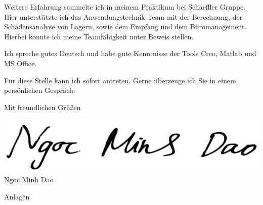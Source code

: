 \documentclass[11pt,a4paper]{letter}
\begin{document}

Weitere Erfahrung sammelte ich in meinem Praktikum bei Schaeffler Gruppe.
Hier unterstützte ich das Anwendungstechnik Team mit der Berechnung, der Schadensanalyse von Lagern, sowie dem Empfang und dem Büromanagement.
Hierbei konnte ich meine Teamfähigkeit unter Beweis stellen.

Ich spreche gutes Deutsch und habe gute Kenntnisse der Tools Creo, Matlab und MS Office.

Für diese Stelle kann ich sofort antreten.
Gerne überzeuge ich Sie in einem persönlichen Gespräch.

Mit freundlichen Grüßen

\includegraphics[scale=0.2]{./signaturen/NgocMinhDao-Signatur.pdf}\\
Ngoc Minh Dao

Anlagen
\end{document}
